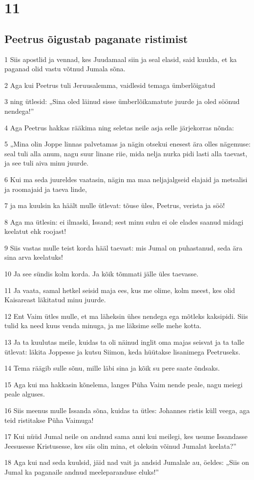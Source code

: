 \chapter{11}

\section*{Peetrus õigustab paganate ristimist}

\par 1 Siis apostlid ja vennad, kes Juudamaal siin ja seal elasid, said kuulda, et ka paganad olid vastu võtnud Jumala sõna.
\par 2 Aga kui Peetrus tuli Jeruusalemma, vaidlesid temaga ümberlõigatud
\par 3 ning ütlesid: „Sina oled läinud sisse ümberlõikamatute juurde ja oled söönud nendega!”
\par 4 Aga Peetrus hakkas rääkima ning seletas neile asja selle järjekorras nõnda:
\par 5 „Mina olin Joppe linnas palvetamas ja nägin otsekui enesest ära olles nägemuse: seal tuli alla anum, nagu suur linane riie, mida nelja nurka pidi lasti alla taevast, ja see tuli aiva minu juurde.
\par 6 Kui ma seda juureldes vaatasin, nägin ma maa neljajalgseid elajaid ja metsalisi ja roomajaid ja taeva linde,
\par 7 ja ma kuulsin ka häält mulle ütlevat: tõuse üles, Peetrus, verista ja söö!
\par 8 Aga ma ütlesin: ei ilmaski, Issand; sest minu suhu ei ole elades saanud midagi keelatut ehk roojast!
\par 9 Siis vastas mulle teist korda hääl taevast: mis Jumal on puhastanud, seda ära sina arva keelatuks!
\par 10 Ja see sündis kolm korda. Ja kõik tõmmati jälle üles taevasse.
\par 11 Ja vaata, samal hetkel seisid maja ees, kus me olime, kolm meest, kes olid Kaisareast läkitatud minu juurde.
\par 12 Ent Vaim ütles mulle, et ma läheksin ühes nendega ega mõtleks kaksipidi. Siis tulid ka need kuus venda minuga, ja me läksime selle mehe kotta.
\par 13 Ja ta kuulutas meile, kuidas ta oli näinud inglit oma majas seisvat ja ta talle ütlevat: läkita Joppesse ja kutsu Siimon, keda hüütakse lisanimega Peetruseks.
\par 14 Tema räägib sulle sõnu, mille läbi sina ja kõik su pere saate õndsaks.
\par 15 Aga kui ma hakkasin kõnelema, langes Püha Vaim nende peale, nagu meiegi peale alguses.
\par 16 Siis meenus mulle Issanda sõna, kuidas ta ütles: Johannes ristis küll veega, aga teid ristitakse Püha Vaimuga!
\par 17 Kui nüüd Jumal neile on andnud sama anni kui meilegi, kes usume Issandasse Jeesusesse Kristusesse, kes siis olin mina, et oleksin võinud Jumalat keelata?”
\par 18 Aga kui nad seda kuulsid, jäid nad vait ja andsid Jumalale au, öeldes: „Siis on Jumal ka paganaile andnud meeleparanduse eluks!”

